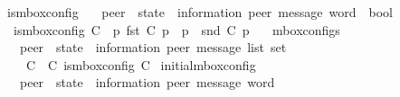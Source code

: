 \begin{isabellebody}
\endisatagdocument
{\isafolddocument}%
%
\isadelimdocument
%
\endisadelimdocument
{}\isamarkupfalse%
\ is{\isacharunderscore}{\kern0pt}mbox{\isacharunderscore}{\kern0pt}config\isanewline
\ \ {\isacharcolon}{\kern0pt}{\isacharcolon}{\kern0pt}\ {\isachardoublequoteopen}{\isacharparenleft}{\kern0pt}{\isacharprime}{\kern0pt}peer\ {\isasymRightarrow}\ {\isacharparenleft}{\kern0pt}{\isacharprime}{\kern0pt}state\ {\isasymtimes}\ {\isacharparenleft}{\kern0pt}{\isacharprime}{\kern0pt}information{\isacharcomma}{\kern0pt}\ {\isacharprime}{\kern0pt}peer{\isacharparenright}{\kern0pt}\ message\ word{\isacharparenright}{\kern0pt}{\isacharparenright}{\kern0pt}\ {\isasymRightarrow}\ bool{\isachardoublequoteclose}\ \isanewline
\ \ {\isachardoublequoteopen}is{\isacharunderscore}{\kern0pt}mbox{\isacharunderscore}{\kern0pt}config\ C\ {\isasymequiv}\ {\isacharparenleft}{\kern0pt}{\isasymforall}p{\isachardot}{\kern0pt}\ fst\ {\isacharparenleft}{\kern0pt}C\ p{\isacharparenright}{\kern0pt}\ {\isasymin}\ {\isasymS}{\isacharparenleft}{\kern0pt}p{\isacharparenright}{\kern0pt}\ {\isasymand}\ snd\ {\isacharparenleft}{\kern0pt}C\ p{\isacharparenright}{\kern0pt}\ {\isasymin}\ {\isasymM}\isactrlsup {\isacharasterisk}{\kern0pt}{\isacharparenright}{\kern0pt}{\isachardoublequoteclose}\isanewline
\isanewline
%
\isanewline
{}\isamarkupfalse%
\ mbox{\isacharunderscore}{\kern0pt}configs\ \isanewline
\ \ {\isacharcolon}{\kern0pt}{\isacharcolon}{\kern0pt}\ {\isachardoublequoteopen}{\isacharparenleft}{\kern0pt}{\isacharprime}{\kern0pt}peer\ {\isasymRightarrow}\ {\isacharprime}{\kern0pt}state\ {\isasymtimes}\ {\isacharparenleft}{\kern0pt}{\isacharprime}{\kern0pt}information{\isacharcomma}{\kern0pt}\ {\isacharprime}{\kern0pt}peer{\isacharparenright}{\kern0pt}\ message\ list{\isacharparenright}{\kern0pt}\ set{\isachardoublequoteclose}\ \ {\isacharparenleft}{\kern0pt}{\isachardoublequoteopen}{\isasymC}\isactrlsub {\isasymmm}{\isachardoublequoteclose}{\isacharparenright}{\kern0pt}\ \isanewline
\ \ {\isachardoublequoteopen}{\isasymC}\isactrlsub {\isasymmm}\ {\isasymequiv}\ {\isacharbraceleft}{\kern0pt}C\ {\isacharbar}{\kern0pt}\ C{\isachardot}{\kern0pt}\ is{\isacharunderscore}{\kern0pt}mbox{\isacharunderscore}{\kern0pt}config\ C{\isacharbraceright}{\kern0pt}{\isachardoublequoteclose}\isanewline
\isanewline
{}\isamarkupfalse%
\ initial{\isacharunderscore}{\kern0pt}mbox{\isacharunderscore}{\kern0pt}config\isanewline
\ \ {\isacharcolon}{\kern0pt}{\isacharcolon}{\kern0pt}\ {\isachardoublequoteopen}{\isacharprime}{\kern0pt}peer\ {\isasymRightarrow}\ {\isacharparenleft}{\kern0pt}{\isacharprime}{\kern0pt}state\ {\isasymtimes}\ {\isacharparenleft}{\kern0pt}{\isacharprime}{\kern0pt}information{\isacharcomma}{\kern0pt}\ {\isacharprime}{\kern0pt}peer{\isacharparenright}{\kern0pt}\ message\ word{\isacharparenright}{\kern0pt}{\isachardoublequoteclose}\ \ {\isacharparenleft}{\kern0pt}{\isachardoublequoteopen}{\isasymC}\isactrlsub {\isasymI}\isactrlsub {\isasymmm}{\isachardoublequoteclose}{\isacharparenright}{\kern0pt}\ \isanewline

\end{isabellebody}
